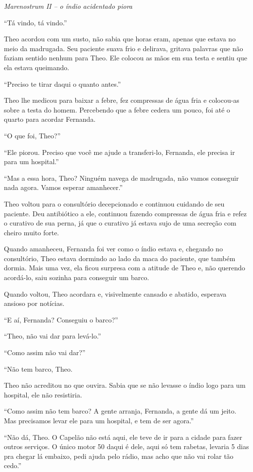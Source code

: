 \asterisc

\emph{Marenostrum II -- o índio acidentado piora}

``Tá vindo, tá vindo.''

Theo acordou com um susto, não sabia que horas eram, apenas que estava
no meio da madrugada. Seu paciente suava frio e delirava, gritava
palavras que não faziam sentido nenhum para Theo. Ele colocou as mãos em
sua testa e sentiu que ela estava queimando.

``Preciso te tirar daqui o quanto antes.''

Theo lhe medicou para baixar a febre, fez compressas de água fria e
colocou-as sobre a testa do homem. Percebendo que a febre cedera um
pouco, foi até o quarto para acordar Fernanda.

``O que foi, Theo?''

``Ele piorou. Preciso que você me ajude a transferi-lo, Fernanda, ele
precisa ir para um hospital.''

``Mas a essa hora, Theo? Ninguém navega de madrugada, não vamos
conseguir nada agora. Vamos esperar amanhecer.''

Theo voltou para o consultório decepcionado e continuou cuidando de seu
paciente. Deu antibiótico a ele, continuou fazendo compressas de água
fria e refez o curativo de sua perna, já que o curativo já estava sujo
de uma secreção com cheiro muito forte.

Quando amanheceu, Fernanda foi ver como o índio estava e, chegando no
consultório, Theo estava dormindo ao lado da maca do paciente, que
também dormia. Mais uma vez, ela ficou surpresa com a atitude de Theo e,
não querendo acordá-lo, saiu sozinha para conseguir um barco.

Quando voltou, Theo acordara e, visivelmente cansado e abatido, esperava
ansioso por notícias.

``E aí, Fernanda? Conseguiu o barco?''

``Theo, não vai dar para levá-lo.''

``Como assim não vai dar?''

``Não tem barco, Theo.

Theo não acreditou no que ouvira. Sabia que se não levasse o índio logo
para um hospital, ele não resistiria.

``Como assim não tem barco? A gente arranja, Fernanda, a gente dá um
jeito. Mas precisamos levar ele para um hospital, e tem de ser agora.''

``Não dá, Theo. O Capelão não está aqui, ele teve de ir para a cidade
para fazer outros serviços. O único motor 50 daqui é dele, aqui só tem
rabetas, levaria 5 dias pra chegar lá embaixo, pedi ajuda pelo rádio,
mas acho que não vai rolar tão cedo.''

